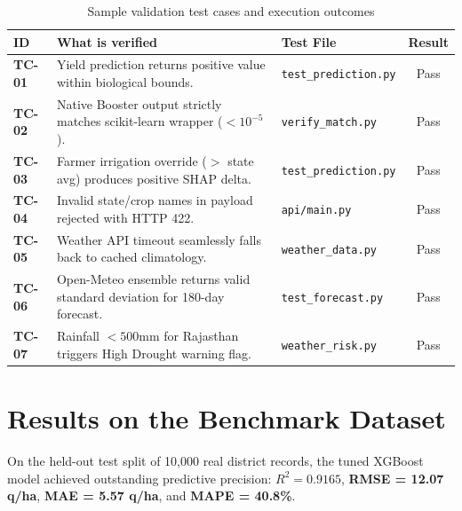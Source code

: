 \documentclass[11pt,a4paper]{report}
\begin{document}
\begin{table}[htbp]
\centering
\small
\caption{Sample validation test cases and execution outcomes}
\begin{tabularx}{\textwidth}{lXlc}
\toprule
\textbf{ID} & \textbf{What is verified} & \textbf{Test File} & \textbf{Result} \\
\midrule
\textbf{TC-01} & Yield prediction returns positive value within biological bounds. & \texttt{test\_prediction.py} & Pass \\
\textbf{TC-02} & Native Booster output strictly matches scikit-learn wrapper ($< 10^{-5}$). & \texttt{verify\_match.py} & Pass \\
\textbf{TC-03} & Farmer irrigation override ($>$ state avg) produces positive SHAP delta. & \texttt{test\_prediction.py} & Pass \\
\textbf{TC-04} & Invalid state/crop names in payload rejected with HTTP 422. & \texttt{api/main.py} & Pass \\
\textbf{TC-05} & Weather API timeout seamlessly falls back to cached climatology. & \texttt{weather\_data.py} & Pass \\
\textbf{TC-06} & Open-Meteo ensemble returns valid standard deviation for 180-day forecast. & \texttt{test\_forecast.py} & Pass \\
\textbf{TC-07} & Rainfall $< 500\text{mm}$ for Rajasthan triggers High Drought warning flag. & \texttt{weather\_risk.py} & Pass \\
\bottomrule
\end{tabularx}
\end{table}

\section{Results on the Benchmark Dataset}
On the held-out test split of 10,000 real district records, the tuned XGBoost model achieved outstanding predictive precision: \textbf{$R^2 = 0.9165$}, \textbf{RMSE = 12.07 q/ha}, \textbf{MAE = 5.57 q/ha}, and \textbf{MAPE = 40.8\%}.
\end{document}

